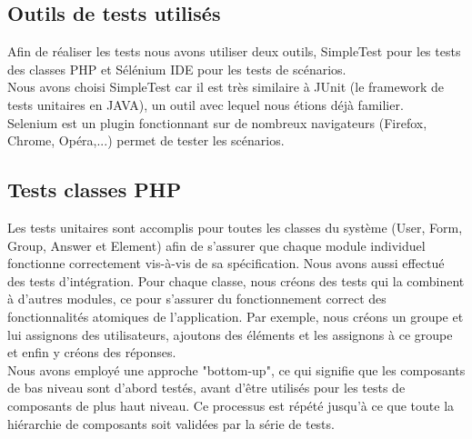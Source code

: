 \documentclass{sigplanconf}
\begin{document}
\subsection{Outils de tests utilisés}
Afin de réaliser les tests nous avons utiliser deux outils, SimpleTest pour les tests des classes PHP et Sélénium IDE pour les tests de scénarios.\\
Nous avons choisi SimpleTest car il est très similaire à JUnit (le framework de tests unitaires en JAVA), un outil avec lequel nous étions déjà familier.\\
Selenium est un plugin fonctionnant sur de nombreux navigateurs (Firefox, Chrome, Opéra,...) permet de tester les scénarios.

\subsection{Tests classes PHP} %
Les tests unitaires sont accomplis pour toutes les classes du système (User, Form, Group, Answer et Element) afin de s'assurer que chaque module individuel fonctionne correctement vis-à-vis de sa spécification. Nous avons aussi effectué des tests d'intégration. Pour chaque classe, nous créons des tests qui la combinent à d'autres modules, ce pour s'assurer du fonctionnement correct des fonctionnalités atomiques de l'application. Par exemple, nous créons un groupe et lui assignons des utilisateurs, ajoutons des éléments et les assignons à ce groupe et enfin y créons des réponses.\\
Nous avons employé une approche "bottom-up", ce qui signifie que les composants de bas niveau sont d'abord testés, avant d'être utilisés pour les tests de composants de plus haut niveau. Ce processus est répété jusqu'à ce que toute la hiérarchie de composants soit validées par la série de tests.
\end{document}
